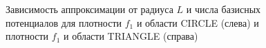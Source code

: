 \documentclass[a4paper]{article}
\begin{document}
\begin{figure}[!h]
\begin{minipage}[h]{0.49\linewidth}
  \end{minipage}
  \caption{Зависимость аппроксимации от радиуса $L$ и числа базисных потенциалов для плотности $f_1$ и области CIRCLE (слева) и  плотности $f_1$ и области TRIANGLE (справа)}
  \label{r1}
\end{figure}
\end{document}

